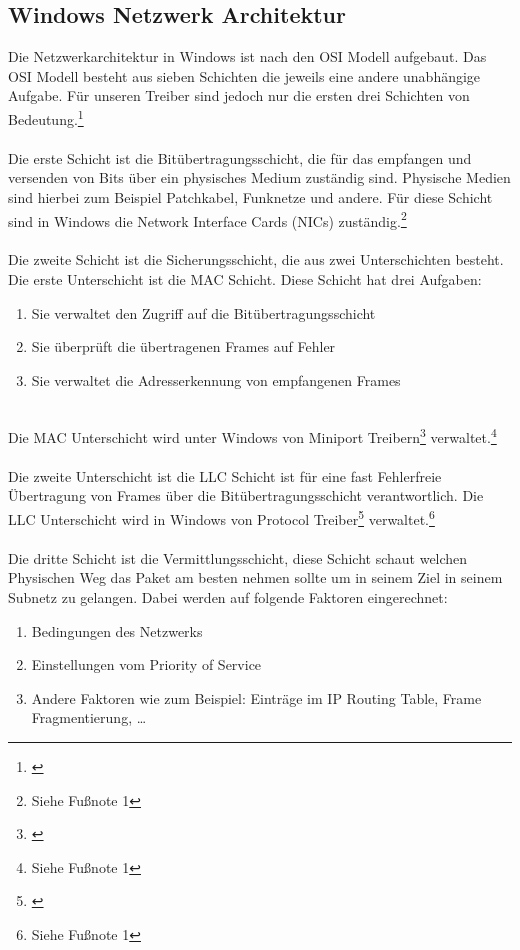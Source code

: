 \subsection{Windows Netzwerk Architektur}
Die Netzwerkarchitektur in Windows ist nach den OSI Modell aufgebaut. Das OSI Modell besteht aus sieben Schichten die jeweils eine andere unabhängige Aufgabe. Für unseren Treiber sind jedoch nur die ersten drei Schichten von Bedeutung.\footnote[1]{\cite[Vgl.][]{27}}
\\\\
Die erste Schicht ist die Bitübertragungsschicht, die für das empfangen und versenden von Bits über ein physisches Medium zuständig sind. Physische Medien sind hierbei zum Beispiel Patchkabel, Funknetze und andere. Für diese Schicht sind in Windows die Network Interface Cards (NICs) zuständig.\footnote[2]{Siehe Fußnote 1}
\\\\
Die zweite Schicht ist die Sicherungsschicht, die aus zwei Unterschichten besteht. Die erste Unterschicht ist die MAC Schicht. Diese Schicht hat drei Aufgaben:
\\
\begin{enumerate}
    \item Sie verwaltet den Zugriff auf die Bitübertragungsschicht
    \item Sie überprüft die übertragenen Frames auf Fehler
    \item Sie verwaltet die Adresserkennung von empfangenen Frames
\end{enumerate}
\ \\
Die MAC Unterschicht wird unter Windows von Miniport Treibern\footnote[3]{\cite[Vgl.][]{25}} verwaltet.\footnote[4]{Siehe Fußnote 1}
\\\\
Die zweite Unterschicht ist die LLC Schicht ist für eine fast Fehlerfreie Übertragung von Frames über die Bitübertragungsschicht verantwortlich. Die LLC Unterschicht wird in Windows von Protocol Treiber\footnote[5]{\cite[Vgl.][]{26}} verwaltet.\footnote[6]{Siehe Fußnote 1}
\\\\
Die dritte Schicht ist die Vermittlungsschicht, diese Schicht schaut welchen Physischen Weg das Paket am besten nehmen sollte um in seinem Ziel in seinem Subnetz zu gelangen. Dabei werden auf folgende Faktoren eingerechnet:
\\
\begin{enumerate}
    \item Bedingungen des Netzwerks
    \item Einstellungen vom Priority of Service
    \item Andere Faktoren wie zum Beispiel: Einträge im IP Routing Table, Frame Fragmentierung, …
\end{enumerate}
